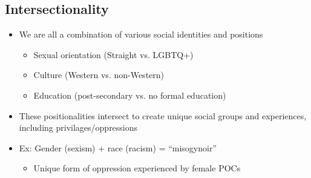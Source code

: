 \documentclass[a4paper]{article}
\begin{document}
\subsection{Intersectionality}
\begin{itemize}
\item We are all a combination of various social identities and positions \begin{itemize}
\item Sexual orientation (Straight vs. LGBTQ+)
\item Culture (Western vs. non-Western)
\item Education (post-secondary vs. no formal education)
\end{itemize}
\item These positionalities intersect to create unique social groups and experiences, including privilages/oppressions
\item Ex: Gender (sexism) + race (racism) = ``misogynoir'' \begin{itemize}
\item Unique form of oppression experienced by female POCs
\end{itemize}
\end{itemize}
\end{document}
